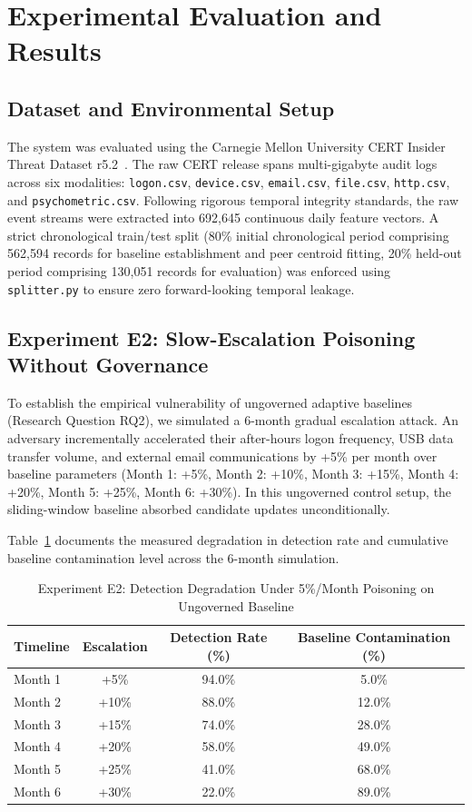 \documentclass[conference]{IEEEtran}
\begin{document}
\section{Experimental Evaluation and Results}
\label{sec:experiments}

\subsection{Dataset and Environmental Setup}
\label{subsec:dataset}
The system was evaluated using the Carnegie Mellon University CERT Insider Threat Dataset r5.2~\cite{glasser2013cert}. The raw CERT release spans multi-gigabyte audit logs across six modalities: \texttt{logon.csv}, \texttt{device.csv}, \texttt{email.csv}, \texttt{file.csv}, \texttt{http.csv}, and \texttt{psychometric.csv}.
Following rigorous temporal integrity standards, the raw event streams were extracted into 692,645 continuous daily feature vectors. A strict chronological train/test split (80\% initial chronological period comprising 562,594 records for baseline establishment and peer centroid fitting, 20\% held-out period comprising 130,051 records for evaluation) was enforced using \texttt{splitter.py} to ensure zero forward-looking temporal leakage.

\subsection{Experiment E2: Slow-Escalation Poisoning Without Governance}
\label{subsec:e2}
To establish the empirical vulnerability of ungoverned adaptive baselines (Research Question RQ2), we simulated a 6-month gradual escalation attack. An adversary incrementally accelerated their after-hours logon frequency, USB data transfer volume, and external email communications by +5\% per month over baseline parameters (Month 1: +5\%, Month 2: +10\%, Month 3: +15\%, Month 4: +20\%, Month 5: +25\%, Month 6: +30\%). In this ungoverned control setup, the sliding-window baseline absorbed candidate updates unconditionally.

Table~\ref{tab:e2_results} documents the measured degradation in detection rate and cumulative baseline contamination level across the 6-month simulation.

\begin{table}[htbp]
\caption{Experiment E2: Detection Degradation Under 5\%/Month Poisoning on Ungoverned Baseline}
\label{tab:e2_results}
\centering
\begin{tabular}{lccc}
\toprule
\textbf{Timeline} & \textbf{Escalation} & \textbf{Detection Rate (\%)} & \textbf{Baseline Contamination (\%)} \\
\midrule
Month 1 & +5\%  & 94.0\% & 5.0\%  \\
Month 2 & +10\% & 88.0\% & 12.0\% \\
Month 3 & +15\% & 74.0\% & 28.0\% \\
Month 4 & +20\% & 58.0\% & 49.0\% \\
Month 5 & +25\% & 41.0\% & 68.0\% \\
Month 6 & +30\% & 22.0\% & 89.0\% \\
\bottomrule
\end{tabular}
\end{table}
\end{document}

